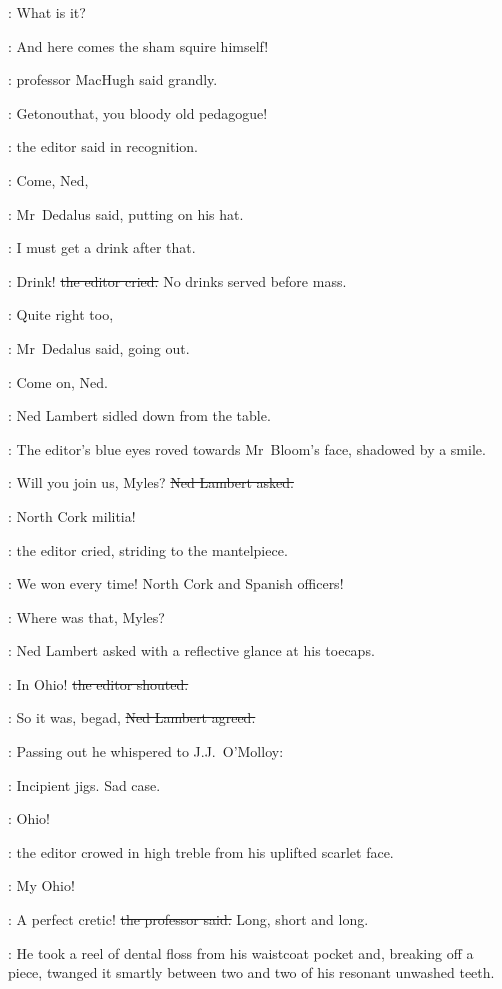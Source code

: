 \crawford:
What is it?

\machugh:
And here comes the sham squire himself!

:
professor MacHugh said grandly.

\crawford:
Getonouthat, you bloody old pedagogue!

:
the editor said in recognition.

\simon:
Come, Ned,

:
Mr~Dedalus said, putting on his hat.

\simon:
I must get a drink after that.

\crawford:
Drink!
\sout{the editor cried.}
No drinks served before mass.

\simon:
Quite right too,

:
Mr~Dedalus said, going out.

\simon:
Come on, Ned.

:
Ned Lambert sidled down from the table.

:
The editor's blue eyes roved towards Mr~Bloom's face,
shadowed by a smile.

\lambert:
Will you join us, Myles?
\sout{Ned Lambert asked.}



\crawford:
North Cork militia!

:
the editor cried,
striding to the mantelpiece.

\crawford:
We won every time!
North Cork and Spanish officers!

\lambert:
Where was that, Myles?

:
Ned Lambert asked with a reflective glance at his toecaps.

\crawford:
In Ohio!
\sout{the editor shouted.}

\lambert:
So it was, begad,
\sout{Ned Lambert agreed.}

:
Passing out he whispered to J.J.~O'Molloy:

\lambert:
Incipient jigs.
Sad case.

\crawford:
Ohio!

:
the editor crowed in high treble from his uplifted scarlet face.

\crawford:
My Ohio!

\machugh:
A perfect cretic!
\sout{the professor said.}
Long, short and long.




:
He took a reel of dental floss from his waistcoat pocket
and, breaking off a piece,
twanged it smartly between two and two of his resonant unwashed teeth.

